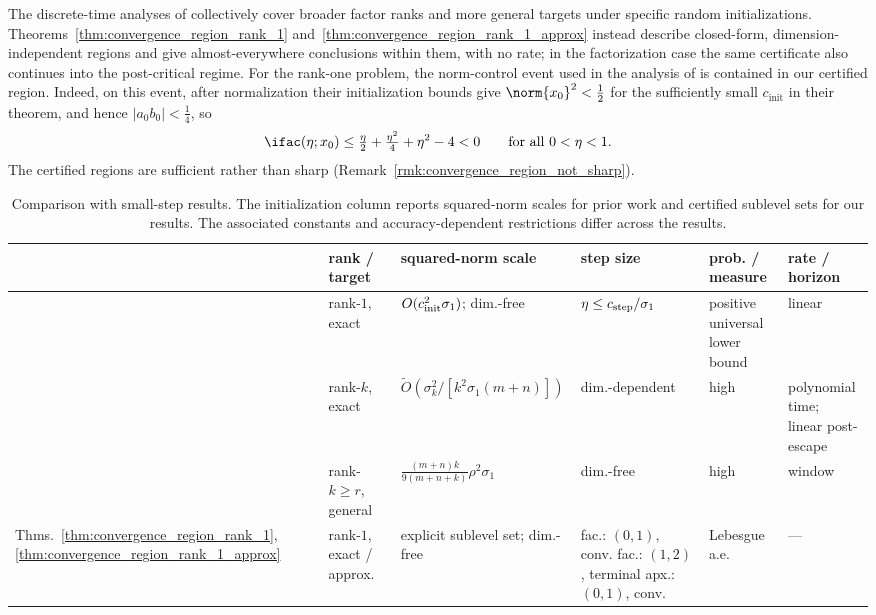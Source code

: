 \documentclass{article}
\begin{document}
The discrete-time analyses of
\cite{du2018algorithmic,ye2021global,jiang2023algorithmic} collectively cover
broader factor ranks and more general targets under specific random
initializations.
Theorems~\ref{thm:convergence_region_rank_1}
and~\ref{thm:convergence_region_rank_1_approx} instead describe closed-form,
dimension-independent regions and give almost-everywhere conclusions within
them, with no rate; in the factorization case the same certificate also
continues into the post-critical regime. For the rank-one problem, the
norm-control event used in the analysis of \citet{du2018algorithmic} is
contained in our certified region. Indeed, on this event, after normalization
their initialization bounds give $\norm{x_0}^2<\tfrac12$ for the sufficiently
small $c_{\mathrm{init}}$ in their theorem, and hence
$\lvert a_0b_0\rvert<\tfrac14$, so
\begin{align}
    \ifac(\eta;x_0)
    \le
    \tfrac{\eta}{2}+\tfrac{\eta^2}{4}+\eta^2-4
    <0
    \qquad\text{for all }0<\eta<1.
\end{align}
The certified regions are sufficient rather than sharp
(Remark~\ref{rmk:convergence_region_not_sharp}).

\begin{table}[t]
\centering
\scriptsize
\setlength{\tabcolsep}{2pt}
\caption{Comparison with small-step results. The initialization column reports
squared-norm scales for prior work and certified sublevel sets for our results.
The associated constants and accuracy-dependent restrictions differ across the
results.}
\label{tab:rw_small_step}
\begin{tabular}{@{}llllll@{}}
\toprule
& rank / target & squared-norm scale & step size & prob. / measure & rate / horizon \\
\midrule
\cite{du2018algorithmic}
& rank-$1$, exact
& $O(c_{\rm init}^2\sigma_1)$; dim.-free
& $\eta\le c_{\rm step}/\sigma_1$
& \shortstack{positive universal\\lower bound}
& linear \\
\cmidrule(lr){1-6}
\cite{ye2021global}
& rank-$k$, exact
& $\widetilde O\!\left(\sigma_k^2/[k^2\sigma_1(m{+}n)]\right)$
& dim.-dependent
& high
& \shortstack{polynomial time;\\linear post-escape} \\
\cmidrule(lr){1-6}
\cite{jiang2023algorithmic}
& rank-$k\ge r$, general
& $\tfrac{(m+n)k}{9(m{+}n{+}k)}\rho^2\sigma_1$
& dim.-free
& high
& window \\
\cmidrule(lr){1-6}
Thms.~\ref{thm:convergence_region_rank_1},
\ref{thm:convergence_region_rank_1_approx}
& rank-$1$, exact / approx.
& explicit sublevel set; dim.-free
& \shortstack[l]{fac.: $(0,1)$, conv.\\
fac.: $(1,2)$, terminal\\
apx.: $(0,1)$, conv.}
& Lebesgue a.e.
& --- \\
\bottomrule
\end{tabular}
\end{table}
\end{document}
